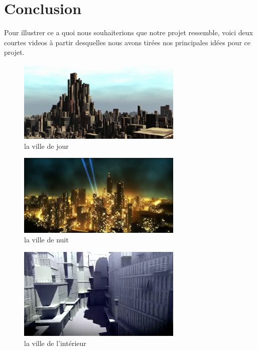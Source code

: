 \documentclass[a4paper,12pt]{article}
\begin{document}
\section*{Conclusion}

Pour illustrer ce a quoi nous souhaiterions que notre projet ressemble, voici deux courtes videos à partir desquelles nous avons tirées nos principales idées pour ce projet.
\begin{figure}[h!]
  \centering

\includegraphics[width=0.7\textwidth]{images/shot0003.png}
  \caption{la ville de jour}
  \label{fig:villes1}
\end{figure}
\begin{figure}[h!]
  \centering

\includegraphics[width=0.7\textwidth]{images/shot0005.png}
  \caption{la ville de nuit}
  \label{fig:villes2}
\end{figure}
\begin{figure}[h!]
  \centering

\includegraphics[width=0.7\textwidth]{images/shot0006.png}
  \caption{la ville de l'intérieur}
  \label{fig:villes3}
\end{figure}

\end{document}
